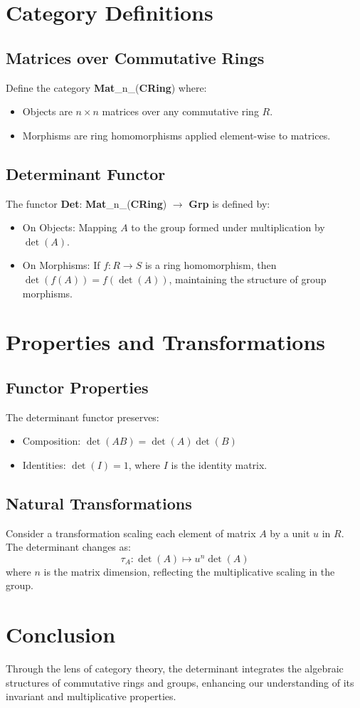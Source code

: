 \newpage
\section{Category Definitions}
\subsection{Matrices over Commutative Rings}
Define the category \textbf{Mat}\_n\_(\textbf{CRing}) where:
\begin{itemize}
	\item Objects are \(n \times n\) matrices over any commutative ring \(R\).
	\item Morphisms are ring homomorphisms applied element-wise to matrices.
\end{itemize}

\subsection{Determinant Functor}
The functor \textbf{Det}: \textbf{Mat}\_n\_(\textbf{CRing}) \(\rightarrow\) \textbf{Grp} is defined by:
\begin{itemize}
	\item On Objects: Mapping \(A\) to the group formed under multiplication by \(\det(A)\).
	\item On Morphisms: If \(f: R \rightarrow S\) is a ring homomorphism, then \(\det(f(A)) = f(\det(A))\), maintaining the structure of group morphisms.
\end{itemize}

\section{Properties and Transformations}
\subsection{Functor Properties}
The determinant functor preserves:
\begin{itemize}
	\item Composition: \(\det(AB) = \det(A)\det(B)\)
	\item Identities: \(\det(I) = 1\), where \(I\) is the identity matrix.
\end{itemize}

\subsection{Natural Transformations}
Consider a transformation scaling each element of matrix \(A\) by a unit \(u\) in \(R\). The determinant changes as:
\[ \tau_A: \det(A) \mapsto u^n \det(A) \]
where \(n\) is the matrix dimension, reflecting the multiplicative scaling in the group.

\section{Conclusion}
Through the lens of category theory, the determinant integrates the algebraic structures of commutative rings and groups, enhancing our understanding of its invariant and multiplicative properties.
